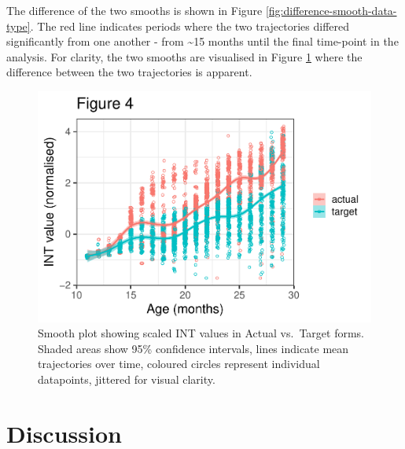 \documentclass[
  man]{apa6}
\begin{document}
The difference of the two smooths is shown in Figure \ref{fig:difference-smooth-data-type}. The red line indicates periods where the two trajectories differed significantly from one another - from \textasciitilde15 months until the final time-point in the analysis. For clarity, the two smooths are visualised in Figure \ref{fig:plotted-smooth-data-type} where the difference between the two trajectories is apparent.

\begin{figure}
\centering
\includegraphics{PhonNetworksProj-revised_files/figure-latex/plotted-smooth-data-type-1.pdf}
\caption{\label{fig:plotted-smooth-data-type}Smooth plot showing scaled INT values in Actual vs.~Target forms. Shaded areas show 95\% confidence intervals, lines indicate mean trajectories over time, coloured circles represent individual datapoints, jittered for visual clarity.}
\end{figure}

\hypertarget{discussion}{%
\section{Discussion}\label{discussion}}
\end{document}
